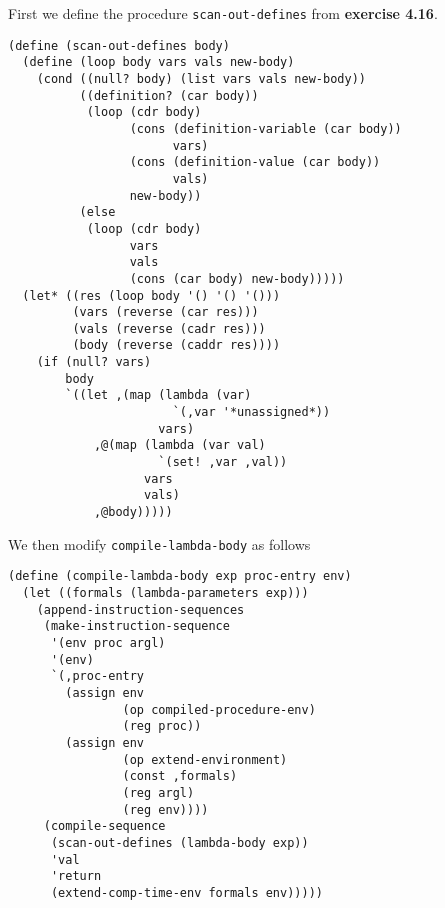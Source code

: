 \documentclass[a4paper,12pt]{article}
\begin{document}
First we define the procedure \lstinline!scan-out-defines! from
\textbf{exercise 4.16}.
\begin{lstlisting}
(define (scan-out-defines body)
  (define (loop body vars vals new-body)
    (cond ((null? body) (list vars vals new-body))
          ((definition? (car body))
           (loop (cdr body)
                 (cons (definition-variable (car body))
                       vars)
                 (cons (definition-value (car body))
                       vals)
                 new-body))
          (else
           (loop (cdr body)
                 vars
                 vals
                 (cons (car body) new-body)))))
  (let* ((res (loop body '() '() '()))
         (vars (reverse (car res)))
         (vals (reverse (cadr res)))
         (body (reverse (caddr res))))
    (if (null? vars)
        body
        `((let ,(map (lambda (var)
                       `(,var '*unassigned*))
                     vars)
            ,@(map (lambda (var val)
                     `(set! ,var ,val))
                   vars
                   vals)
            ,@body)))))
\end{lstlisting}

We then modify \lstinline!compile-lambda-body! as follows

\begin{lstlisting}
(define (compile-lambda-body exp proc-entry env)
  (let ((formals (lambda-parameters exp)))
    (append-instruction-sequences
     (make-instruction-sequence
      '(env proc argl)
      '(env)
      `(,proc-entry
        (assign env
                (op compiled-procedure-env)
                (reg proc))
        (assign env
                (op extend-environment)
                (const ,formals)
                (reg argl)
                (reg env))))
     (compile-sequence
      (scan-out-defines (lambda-body exp))
      'val
      'return
      (extend-comp-time-env formals env)))))
\end{lstlisting}
\end{document}
